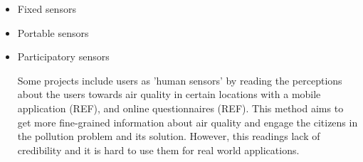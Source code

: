 \begin{itemize}

\item Fixed sensors

\item Portable sensors

\item Participatory sensors

Some projects include users as 'human sensors' by reading the perceptions about the users towards air quality in certain locations with a mobile application (REF), and online questionnaires (REF). This method aims to get more fine-grained information about air quality and engage the citizens in the pollution problem and its solution. However, this readings lack of credibility and it is hard to use them for real world applications.

\end{itemize}



